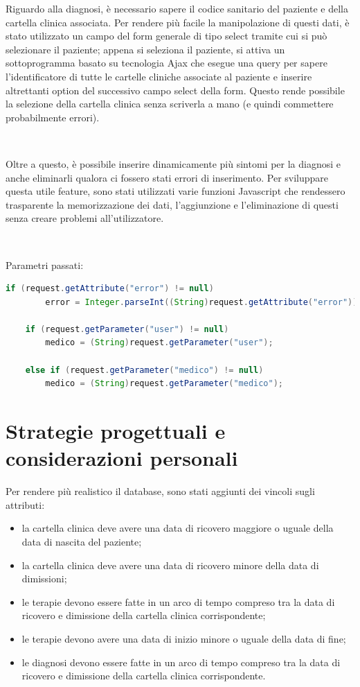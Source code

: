 \documentclass[a4paper,titlepage]{article}
\begin{document}
Riguardo alla diagnosi, è necessario sapere il codice sanitario del paziente e della cartella clinica associata.
Per rendere più facile la manipolazione di questi dati, è stato utilizzato un campo del form generale di tipo select tramite cui si può selezionare il paziente; appena si seleziona il paziente, si attiva un sottoprogramma basato su tecnologia Ajax che esegue una query per sapere l'identificatore di tutte le cartelle cliniche associate al paziente e inserire altrettanti option del successivo campo select della form. Questo rende possibile la selezione della cartella clinica senza scriverla a mano (e quindi commettere probabilmente errori).

~

Oltre a questo, è possibile inserire dinamicamente più sintomi per la diagnosi e anche eliminarli qualora ci fossero stati errori di inserimento. Per sviluppare questa utile feature, sono stati utilizzati varie funzioni Javascript che rendessero trasparente la memorizzazione dei dati, l'aggiunzione e l'eliminazione di questi senza creare problemi all'utilizzatore. 

~

Parametri passati: 
\begin{lstlisting}[language=java]
    if (request.getAttribute("error") != null)
    	error = Integer.parseInt((String)request.getAttribute("error"));
    
    if (request.getParameter("user") != null)
	    medico = (String)request.getParameter("user");

    else if (request.getParameter("medico") != null)
	    medico = (String)request.getParameter("medico");
\end{lstlisting}

\part{Strategie progettuali e considerazioni personali}

Per rendere più realistico il database, sono stati aggiunti dei vincoli sugli attributi:

\begin{itemize}[leftmargin=1.5cm, topsep=0.5cm, itemsep=0.2cm]

\item la cartella clinica deve avere una data di ricovero maggiore o uguale della data di nascita del paziente;

\item la cartella clinica deve avere una data di ricovero minore della data di dimissioni;

\item le terapie devono essere fatte in un arco di tempo compreso tra la data di ricovero e dimissione della cartella clinica corrispondente;

\item le terapie devono avere una data di inizio minore o uguale della data di fine;

\item le diagnosi devono essere fatte in un arco di tempo compreso tra la data di ricovero e dimissione della cartella clinica corrispondente.

\end{itemize}
\end{document}
